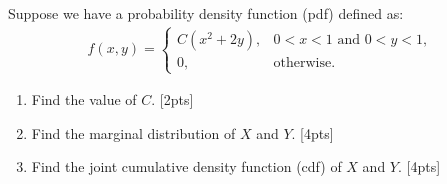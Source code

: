 Suppose we have a probability density function (pdf) defined as:
\begin{align*}
    f(x,y) = \left.
    \begin{cases}
    C(x^2 + 2y), &\text{$0 < x < 1$ and $0 < y < 1$,} \\
    0,    &\text{otherwise.}
   \end{cases}
   \right.
\end{align*}

 \begin{enumerate}
 \item   Find the value of $C$. [2pts]
 \item  Find the marginal distribution of $X$ and $Y$. [4pts]
 \item  Find the joint cumulative density function (cdf) of $X$ and $Y$. [4pts]

  \end{enumerate}

